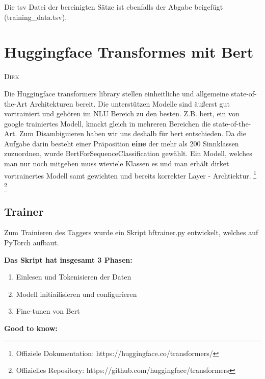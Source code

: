 \documentclass[10pt,a4paper]{article}
\newcommand{\chapterauthor}[1]{%
	{\parindent0pt\vspace*{-5pt}\hspace*{\fill}%
  \linespread{1.1}\large\scshape#1%
  \par\nobreak\vspace*{10pt}}
}
\begin{document}
Die tsv Datei der bereinigten Sätze ist ebenfalls der Abgabe beigefügt (training\_data.tsv).


\section{Huggingface Transformes mit Bert}
\chapterauthor{Dirk}
Die Huggingface transformers library stellen einheitliche und allgemeine state-of-the-Art Architekturen bereit. Die unterstützen Modelle sind äußerst gut vortrainiert und gehören im NLU Bereich zu den besten. Z.B. bert, ein von google trainiertes Modell, knackt gleich in mehreren Bereichen die state-of-the-Art. Zum Disambiguieren haben wir uns deshalb für bert entschieden. Da die Aufgabe darin besteht einer Präposition \textbf{eine} der mehr als 200 Sinnklassen zuzuordnen, wurde BertForSequenceClassification gewählt. Ein Modell, welches man nur noch mitgeben muss wieviele Klassen es und man erhält dirket vortrainertes Modell samt gewichten und bereits korrekter Layer - Archtiektur. \footnote{Offiziele Dokumentation: https://huggingface.co/transformers/} \footnote{Offizielles Repository: https://github.com/huggingface/transformers}

\subsection{Trainer}
Zum Trainieren des Taggers wurde ein Skript hftrainer.py entwickelt, welches auf PyTorch aufbaut.

\vspace{0.25cm}
\textbf{Das Skript hat insgesamt 3 Phasen:}

\begin{enumerate}
	\item Einlesen und Tokenisieren der Daten
	\item Modell initiailisieren und configurieren
	\item Fine-tunen von Bert
\end{enumerate}


\textbf{Good to know:}
\end{document}
